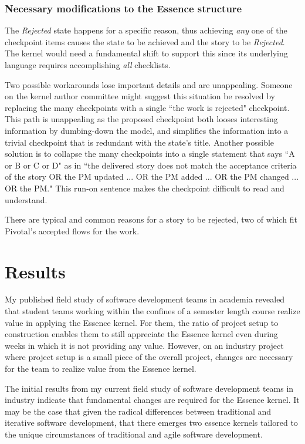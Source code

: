 \documentclass[preprint,12pt,3p]{elsarticle}
\begin{document}
\subsubsection{Necessary modifications to the Essence structure}

The \textit{Rejected} state happens for a specific reason, thus achieving \textit{any} one of the checkpoint items causes the state to be achieved and the story to be \textit{Rejected}. The kernel would need a fundamental shift to support this since its underlying language requires accomplishing \textit{all} checklists. 

Two possible workarounds lose important details and are unappealing. Someone on the kernel author committee might suggest this situation be resolved by replacing the many checkpoints with a single ``the work is rejected" checkpoint. This path is unappealing as the proposed checkpoint both looses interesting information by dumbing-down the model, and simplifies the information into a trivial checkpoint that is redundant with the state's title. Another possible solution is to collapse the many checkpoints into a single statement that says ``A or B or C or D" as in ``the delivered story does not match the acceptance criteria of the story OR the PM updated ... OR the PM added ... OR the PM changed ... OR the PM." This run-on sentence makes the checkpoint difficult to read and understand. 

There are typical and common reasons for a story to be rejected, two of which fit Pivotal's accepted flows for the work. 

\section{Results}

My published field study of software development teams in academia revealed that student teams working within the confines of a semester length course realize value in applying the Essence kernel. For them, the ratio of project setup to construction enables them to still appreciate the Essence kernel even during weeks in which it is not providing any value. However, on an industry project where project setup is a small piece of the overall project, changes are necessary for the team to realize value from the Essence kernel.

The initial results from my current field study of software development teams in industry indicate that fundamental changes are required for the Essence kernel. It may be the case that given the radical differences between traditional and iterative software development, that there emerges two essence kernels tailored to the unique circumstances of traditional and agile software development.
\end{document}
